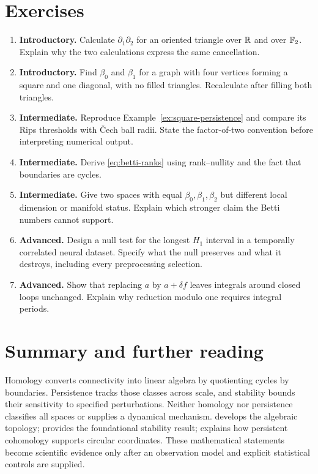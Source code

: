 \section{Exercises}
\begin{enumerate}
\item \textbf{Introductory.} Calculate $\partial_1\partial_2$ for an oriented triangle over $\mathbb{R}$ and over $\mathbb{F}_2$. Explain why the two calculations express the same cancellation.
\item \textbf{Introductory.} Find $\beta_0$ and $\beta_1$ for a graph with four vertices forming a square and one diagonal, with no filled triangles. Recalculate after filling both triangles.
\item \textbf{Intermediate.} Reproduce Example~\ref{ex:square-persistence} and compare its Rips thresholds with \v{C}ech ball radii. State the factor-of-two convention before interpreting numerical output.
\item \textbf{Intermediate.} Derive \eqref{eq:betti-ranks} using rank--nullity and the fact that boundaries are cycles.
\item \textbf{Intermediate.} Give two spaces with equal $\beta_0,\beta_1,\beta_2$ but different local dimension or manifold status. Explain which stronger claim the Betti numbers cannot support.
\item \textbf{Advanced.} Design a null test for the longest $H_1$ interval in a temporally correlated neural dataset. Specify what the null preserves and what it destroys, including every preprocessing selection.
\item \textbf{Advanced.} Show that replacing $a$ by $a+\delta f$ leaves integrals around closed loops unchanged. Explain why reduction modulo one requires integral periods.
\end{enumerate}

\section{Summary and further reading}
Homology converts connectivity into linear algebra by quotienting cycles by boundaries. Persistence tracks those classes across scale, and stability bounds their sensitivity to specified perturbations. Neither homology nor persistence classifies all spaces or supplies a dynamical mechanism. \citet{hatcher2002} develops the algebraic topology; \citet{cohensteiner2007} provides the foundational stability result; \citet{desilva2011} explains how persistent cohomology supports circular coordinates. These mathematical statements become scientific evidence only after an observation model and explicit statistical controls are supplied.
